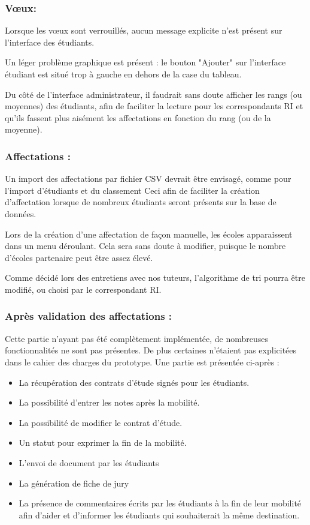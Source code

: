 \subsubsection{Vœux:}
Lorsque les vœux sont verrouillés, aucun message explicite n'est présent sur l'interface des étudiants.

Un léger problème graphique est présent : le bouton "Ajouter" sur l'interface étudiant est situé trop à gauche en dehors de la case du tableau.

Du côté de l'interface administrateur, il faudrait sans doute afficher les rangs (ou moyennes) des étudiants, afin de faciliter la lecture pour les correspondants RI et qu'ils fassent plus aisément les affectations en fonction du rang (ou de la moyenne).


\subsubsection{Affectations :}
Un import des affectations par fichier CSV devrait être envisagé, comme pour l'import d'étudiants et du classement Ceci afin de faciliter la création d'affectation lorsque de nombreux étudiants seront présents sur la base de données.

Lors de la création d'une affectation de façon manuelle, les écoles apparaissent dans un menu déroulant. Cela sera sans doute à modifier, puisque le nombre d'écoles partenaire peut être assez élevé.

Comme décidé lors des entretiens avec nos tuteurs, l'algorithme de tri pourra être modifié, ou choisi par le correspondant RI.


\subsubsection{Après validation des affectations :}
Cette partie n'ayant pas été complètement implémentée, de nombreuses fonctionnalités ne sont pas présentes. De plus certaines n'étaient pas explicitées dans le cahier des charges du prototype. Une partie est présentée ci-après :
\begin{itemize}
\item La récupération des contrats d'étude signés pour les étudiants.
\item La possibilité d'entrer les notes après la mobilité.
\item La possibilité de modifier le contrat d'étude.
\item Un statut pour exprimer la fin de la mobilité.
\item L'envoi de document par les étudiants
\item La génération de fiche de jury
\item La présence de commentaires écrits par les étudiants à la fin de leur mobilité afin d'aider et d'informer les étudiants qui souhaiterait la même destination.
\end{itemize}


